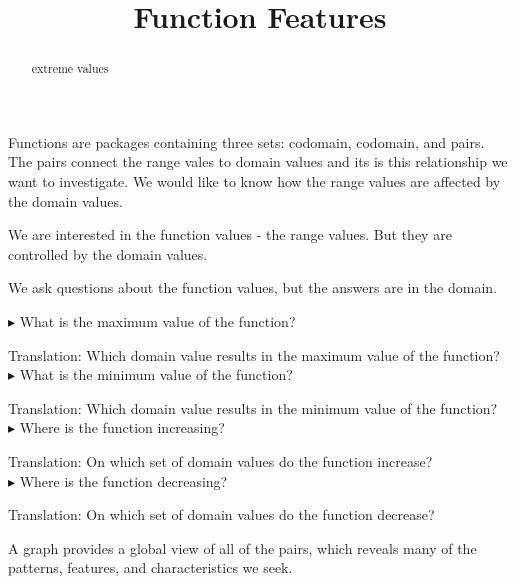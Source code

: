 \documentclass{ximera}
\title{Function Features}
\begin{document}
\begin{abstract}
extreme values
\end{abstract}
\maketitle





Functions are packages containing three sets: codomain, codomain, and pairs.  The pairs connect the range vales to domain values and its is this relationship we want to investigate.   We would like to know how the range values are affected by the domain values. 

We are interested in the function values - the range values.  But they are controlled by the domain values.

We ask questions about the function values, but the answers are in the domain.





\begin{idea}


$\blacktriangleright$ What is the maximum value of the function? 

Translation: Which domain value results in the maximum value of the function? \\


$\blacktriangleright$ What is the minimum value of the function? 

Translation: Which domain value results in the minimum value of the function? \\


$\blacktriangleright$ Where is the function increasing? 

Translation: On which set of domain values do the function increase? \\


$\blacktriangleright$ Where is the function decreasing? 

Translation: On which set of domain values do the function decrease? \\


\end{idea}








A graph provides a global view of all of the pairs, which reveals many of the patterns, features, and characteristics we seek.   
\end{document}

